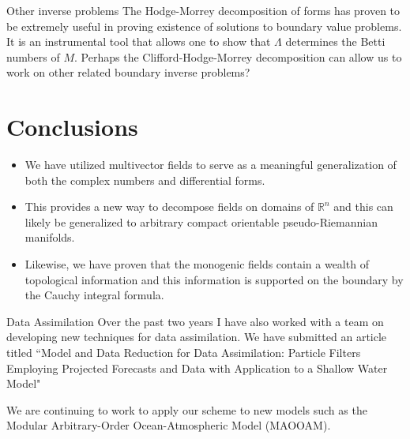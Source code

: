 \documentclass[aspectratio=169,handout]{beamer}
\newcommand{\R}{\mathbb{R}}
\begin{document}
\begin{frame}{Other inverse problems}
The Hodge-Morrey decomposition of forms has proven to be extremely useful in proving existence of solutions to boundary value problems. It is an instrumental tool that allows one to show that $\Lambda$ determines the Betti numbers of $M$. Perhaps the Clifford-Hodge-Morrey decomposition can allow us to work on other related boundary inverse problems?
\end{frame}

\section{Conclusions}

\begin{frame}{}
\begin{itemize}
    \item We have utilized multivector fields to serve as a meaningful generalization of both the complex numbers and differential forms. 
    \item This provides a new way to decompose fields on domains of $\R^n$ and this can likely be generalized to arbitrary compact orientable pseudo-Riemannian manifolds.
    \item Likewise, we have proven that the monogenic fields contain a wealth of topological information and this information is supported on the boundary by the Cauchy integral formula.
\end{itemize}
\end{frame}

\begin{frame}{Data Assimilation}
Over the past two years I have also worked with a team on developing new techniques for data assimilation. We have submitted an article titled
``Model and Data Reduction for Data Assimilation: Particle Filters Employing Projected Forecasts and Data with Application to a Shallow Water Model"

We are continuing to work to apply our scheme to new models such as the Modular Arbitrary-Order Ocean-Atmospheric Model (MAOOAM).
\end{frame}
\end{document}
